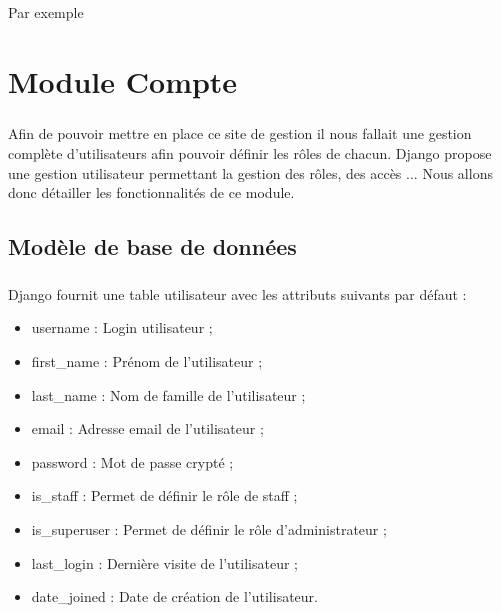 \documentclass[twoside,UTF8]{EPURapport}
\begin{document}
Par exemple

\chapter{Module Compte}

    \paragraph{}Afin de pouvoir mettre en place ce site de gestion il nous fallait une gestion complète d'utilisateurs afin pouvoir définir les rôles de chacun. Django propose une gestion utilisateur permettant la gestion des rôles, des accès ... Nous allons donc détailler les fonctionnalités de ce module.

    \section{Modèle de base de données}

        \paragraph{}Django fournit une table utilisateur avec les attributs suivants par défaut :\\
        \begin{itemize}
            \item username : Login utilisateur ;\\
            \item first\_name : Prénom de l'utilisateur ;\\
            \item last\_name : Nom de famille de l'utilisateur ;\\
            \item email : Adresse email de l'utilisateur ; \\
            \item password : Mot de passe crypté ;\\
            \item is\_staff : Permet de définir le rôle de staff ;\\
            \item is\_superuser : Permet de définir le rôle d'administrateur ;\\
            \item last\_login : Dernière visite de l'utilisateur ;\\
            \item date\_joined : Date de création de l'utilisateur.\\
        \end{itemize}
\end{document}
